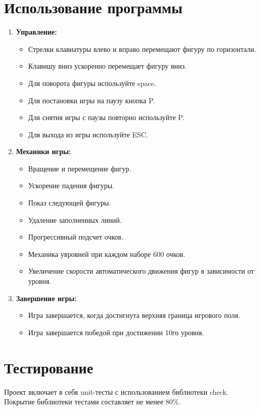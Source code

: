 \documentclass[12pt, letterpaper, twoside]{article}
\begin{document}
\section{Использование программы}

\begin{enumerate}
    \item \textbf{Управление:}
        \begin{itemize}
            \item Стрелки клавиатуры влево и вправо перемещают фигуру по горизонтали.
            \item Клавишу вниз ускоренно перемещает фигуру вниз.
            \item Для поворота фигуры используйте space.
            \item Для постановки игры на паузу кнопка P.
            \item Для снятия игры с паузы повторно используйте P.
            \item Для выхода из игры используйте ESC.
        \end{itemize}
    \item \textbf{Механики игры:}
        \begin{itemize}
            \item Вращение и перемещение фигур.
            \item Ускорение падения фигуры.
            \item Показ следующей фигуры.
            \item Удаление заполненных линий.
            \item Прогрессивный подсчет очков.
            \item Механика увровней при каждом наборе 600 очков.
            \item Увеличение скорости автоматического движения фигур в зависимости от уровня.
        \end{itemize}
    \item \textbf{Завершение игры:}
        \begin{itemize}
            \item Игра завершается, когда достигнута верхняя граница игрового поля.
            \item Игра завершается победой при достижении 10го уровня.
        \end{itemize}
\end{enumerate}

\section{Тестирование}

Проект включает в себя unit-тесты с использованием библиотеки check. Покрытие библиотеки тестами составляет не менее 80\%.
\end{document}
